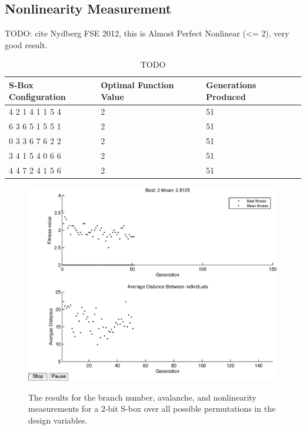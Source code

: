 \documentclass[11pt]{article}
\begin{document}
\subsection{Nonlinearity Measurement}

TODO: cite Nydberg FSE 2012, this is Almost Perfect Nonlinear (<= 2), very good result. \cite{ProvableSecurity}

\begin{table}
	\centering
	\caption{TODO}
	\label{nlTable}
    \begin{tabular}{|l|l|l|}
        \hline
        S-Box Configuration & Optimal Function Value & Generations Produced \\ \hline
        4     2     1     4     1     1     5     4 & 2 & 51 \\ 
        6     3     6     5     1     5     5     1 & 2 & 51 \\ 
        0     3     3     6     7     6     2     2 & 2 & 51 \\ 
        3     4     1     5     4     0     6     6 & 2 & 51 \\ 
        4     4     7     2     4     1     5     6 & 2 & 51 \\ 
        \hline
    \end{tabular}
\end{table}

\begin{figure}
	\centering
	\includegraphics[scale=0.5]{images/nl_results16.eps} \\
	\label{nl16}
\caption{The results for the branch number, avalanche, and nonlinearity measurements for a $2$-bit S-box over all possible permutations in the design variables.}
\end{figure}
\end{document}
